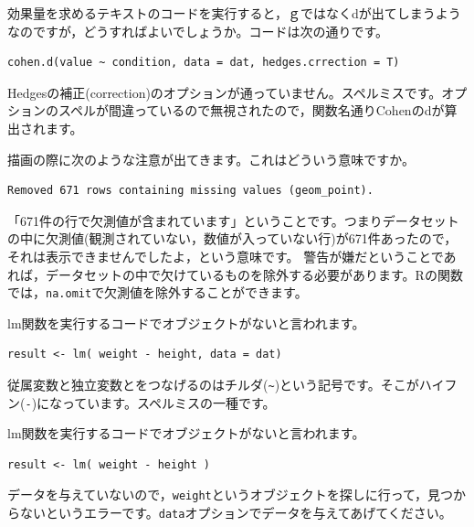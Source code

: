 \documentclass{ltjsbook}
\begin{document}
\begin{FAQ}{効果量を求めるテキストのコードを実行すると，ｇではなくdが出てしまうようなのですが，どうすればよいでしょうか。コードは次の通りです。}{}
	\begin{verbatim}
cohen.d(value ~ condition, data = dat, hedges.crrection = T)
\end{verbatim}
	Hedgesの補正(correction)のオプションが通っていません。スペルミスです。オプションのスペルが間違っているので無視されたので，関数名通りCohenのdが算出されます。
\end{FAQ}


\begin{FAQ}{描画の際に次のような注意が出てきます。これはどういう意味ですか。}{}
	\begin{verbatim}Removed 671 rows containing missing values (geom_point).\end{verbatim}
	「671件の行で欠測値が含まれています」ということです。つまりデータセットの中に欠測値(観測されていない，数値が入っていない行)が671件あったので，それは表示できませんでしたよ，という意味です。
	警告が嫌だということであれば，データセットの中で欠けているものを除外する必要があります。Rの関数では，\verb|na.omit|で欠測値を除外することができます。
\end{FAQ}

\begin{FAQ}{lm関数を実行するコードでオブジェクトがないと言われます。}{}
	\begin{verbatim}
result <- lm( weight - height, data = dat)
\end{verbatim}
	従属変数と独立変数とをつなげるのはチルダ(\verb|~|)という記号です。そこがハイフン(\verb|-|)になっています。スペルミスの一種です。
\end{FAQ}

\begin{FAQ}{lm関数を実行するコードでオブジェクトがないと言われます。}{}
	\begin{verbatim}
result <- lm( weight - height )
\end{verbatim}
	データを与えていないので，\verb|weight|というオブジェクトを探しに行って，見つからないというエラーです。\verb|data|オプションでデータを与えてあげてください。
\end{FAQ}
\end{document}

